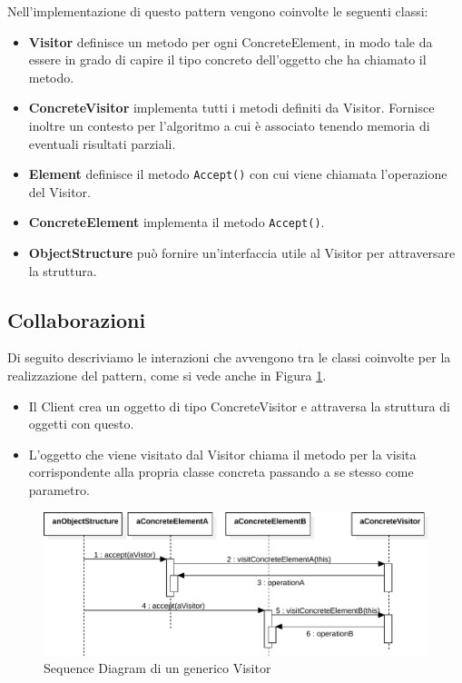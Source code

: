 Nell'implementazione di questo pattern vengono coinvolte le seguenti classi:

\begin{itemize}
\item \textbf{Visitor} definisce un metodo per ogni ConcreteElement, in modo tale da essere in grado di capire il tipo concreto dell'oggetto che ha chiamato il metodo.
\item \textbf{ConcreteVisitor} implementa tutti i metodi definiti da Visitor. Fornisce inoltre un contesto per l'algoritmo a cui è associato tenendo memoria di eventuali risultati parziali.
\item \textbf{Element} definisce il metodo \texttt{Accept()} con cui viene chiamata l'operazione del Visitor.
\item \textbf{ConcreteElement} implementa il metodo \texttt{Accept()}.
\item \textbf{ObjectStructure} può fornire un'interfaccia utile al Visitor per attraversare la struttura.
\end{itemize}

\subsection{Collaborazioni}

Di seguito descriviamo le interazioni che avvengono tra le classi coinvolte per la realizzazione del pattern, come si vede anche in Figura \ref{fig:visitor-pattern-sequence}.

\begin{itemize}
\item Il Client crea un oggetto di tipo ConcreteVisitor e attraversa la struttura di oggetti con questo.
\item L'oggetto che viene visitato dal Visitor chiama il metodo per la visita corrispondente alla propria classe concreta passando a se stesso come parametro.
\end{itemize}

\begin{figure}[htbp]
\centering
\includegraphics[width=\textwidth,height=\textheight,keepaspectratio]{images/visitor-pattern-sequence.pdf}
\caption{Sequence Diagram di un generico Visitor}
\label{fig:visitor-pattern-sequence}
\end{figure}

